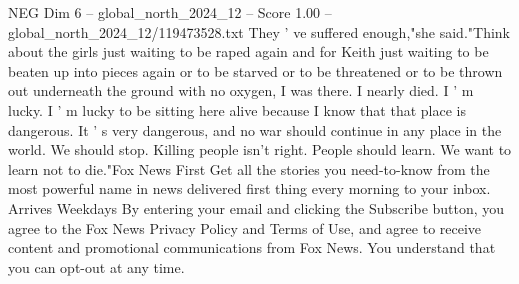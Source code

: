 \begin{textsample}{NEG Dim 6 – global\_north\_2024\_12 – Score 1.00 – global\_north\_2024\_12/119473528.txt}
They ' ve suffered enough,"she said."Think about the girls just waiting to be raped again and for Keith just waiting to be beaten up into pieces again or to be starved or to be threatened or to be thrown out underneath the ground with no oxygen, I was there.
I nearly died.
I ' m lucky.
I ' m lucky to be sitting here alive because I know that that place is dangerous.
It ' s very dangerous, and no war should continue in any place in the world.
We should stop.
Killing people isn't right.
People should learn.
We want to learn not to die."Fox News First Get all the stories you need-to-know from the most powerful name in news delivered first thing every morning to your inbox.
Arrives Weekdays By entering your email and clicking the Subscribe button, you agree to the Fox News Privacy Policy and Terms of Use, and agree to receive content and promotional communications from Fox News.
You understand that you can opt-out at any time.

\end{textsample}
